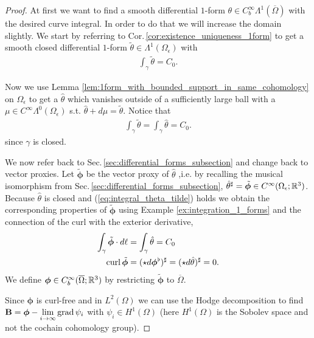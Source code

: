 \documentclass[../master_thesis.tex]{subfiles}
\begin{document}
\begin{proof}
    At first we want to find a smooth differential $1$-form 
    $\theta \in C_b^\infty\Lambda^1(\overline{\Omega})$ with the desired curve integral. 
    In order to do that we will increase the 
    domain slightly.
    We start by referring to Cor.\,\ref{cor:existence_uniqueness_1form} 
    to get a smooth closed differential $1$-form 
    $\tilde{\theta} \in \Lambda^1(\Omega_\epsilon)$ with 
    \begin{align}
        \int_\gamma \tilde{\theta} = C_0. \label{eq:integral_theta_tilde}
    \end{align}

    Now we use Lemma \ref{lem:1form_with_bounded_support_in_same_cohomology} 
    on $\Omega_\epsilon$ to get a $\hat{\theta}$ which vanishes 
    outside of a sufficiently large ball with a $\mu \in C^\infty\Lambda^0 (\Omega_\epsilon)$ s.t. 
    $\hat{\theta} + d\mu= \tilde{\theta}$. Notice that
    \begin{align*}
        \int_\gamma \tilde{\theta} = \int_\gamma \hat{\theta} = C_0. 
    \end{align*}
    since $\gamma$ is closed. 
    
    We now refer back to Sec.\,\ref{sec:differential_forms_subsection} 
    and change back to vector proxies. Let 
    $\tilde{\bm{\phi}}$ be the vector proxy of $\hat{\theta}$ 
    ,i.e. by recalling the musical isomorphism from Sec.\,\ref{sec:differential_forms_subsection},
    $\hat{\theta}^\sharp = \tilde{\bm{\phi}} \in C^\infty(\Omega_\epsilon;\mathbb{R}^3)$.
    Because $\hat{\theta}$ is closed and (\ref{eq:integral_theta_tilde}) holds
    we obtain the corresponding properties 
    of $\tilde{\bm{\phi}}$ using Example \ref{ex:integration_1_forms} and the connection 
    of the curl with the exterior derivative,
    \begin{align*}
        \int_\gamma \tilde{\bm{\phi}} \cdot d\ell &= \int_\gamma \hat{\theta} = C_0 
        \\ \operatorname{curl} \tilde{\bm{\phi}} &= (\star d\boldsymbol{\bm{\phi}}^\flat)^\sharp = 
        (\star d\hat{\theta})^\sharp = 0.
    \end{align*}
    We define $\bm{\phi} \in C_b^\infty(\overline{\Omega};\mathbb{R}^3)$ by restricting $\tilde{\bm{\phi}}$ 
    to $\overline{\Omega}$. 

    Since $\bm{\phi}$ is curl-free and in $L^2(\Omega)$ we can use the Hodge decomposition to find 
    $\mathbf{B} = \bm{\phi} - \lim\limits_{i\rightarrow \infty}\operatorname{grad} \psi_i$ 
    with $\psi_i \in H^1(\Omega)$ (here $H^1(\Omega)$ is the Sobolev space and not the cochain 
    cohomology group).


\end{proof}
\end{document}
